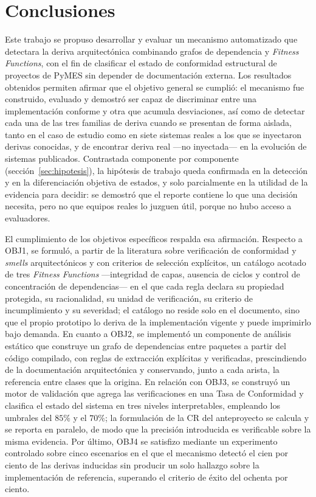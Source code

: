 \section{Conclusiones}
Este trabajo se propuso desarrollar y evaluar un mecanismo automatizado que detectara la deriva arquitectónica combinando grafos de dependencia y \textit{Fitness Functions}, con el fin de clasificar el estado de conformidad estructural de proyectos de PyMES sin depender de documentación externa. Los resultados obtenidos permiten afirmar que el objetivo general se cumplió: el mecanismo fue construido, evaluado y demostró ser capaz de discriminar entre una implementación conforme y otra que acumula desviaciones, así como de detectar cada una de las tres familias de deriva cuando se presentan de forma aislada, tanto en el caso de estudio como en siete sistemas reales a los que se inyectaron derivas conocidas, y de encontrar deriva real ---no inyectada--- en la evolución de sistemas publicados. Contrastada componente por componente (sección~\ref{sec:hipotesis}), la hipótesis de trabajo queda confirmada en la detección y en la diferenciación objetiva de estados, y solo parcialmente en la utilidad de la evidencia para decidir: se demostró que el reporte contiene lo que una decisión necesita, pero no que equipos reales lo juzguen útil, porque no hubo acceso a evaluadores.

El cumplimiento de los objetivos específicos respalda esa afirmación. Respecto a OBJ1, se formuló, a partir de la literatura sobre verificación de conformidad y \textit{smells} arquitectónicos y con criterios de selección explícitos, un catálogo acotado de tres \textit{Fitness Functions} —integridad de capas, ausencia de ciclos y control de concentración de dependencias— en el que cada regla declara su propiedad protegida, su racionalidad, su unidad de verificación, su criterio de incumplimiento y su severidad; el catálogo no reside solo en el documento, sino que el propio prototipo lo deriva de la implementación vigente y puede imprimirlo bajo demanda. En cuanto a OBJ2, se implementó un componente de análisis estático que construye un grafo de dependencias entre paquetes a partir del código compilado, con reglas de extracción explícitas y verificadas, prescindiendo de la documentación arquitectónica y conservando, junto a cada arista, la referencia entre clases que la origina. En relación con OBJ3, se construyó un motor de validación que agrega las verificaciones en una Tasa de Conformidad y clasifica el estado del sistema en tres niveles interpretables, empleando los umbrales del $85\%$ y el $70\%$; la formulación de la CR del anteproyecto se calcula y se reporta en paralelo, de modo que la precisión introducida es verificable sobre la misma evidencia. Por último, OBJ4 se satisfizo mediante un experimento controlado sobre cinco escenarios en el que el mecanismo detectó el cien por ciento de las derivas inducidas sin producir un solo hallazgo sobre la implementación de referencia, superando el criterio de éxito del ochenta por ciento.

